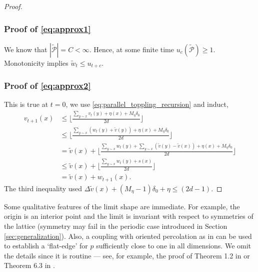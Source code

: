 \documentclass[12pt]{amsart}
\begin{document}
\begin{proof}
	
	\subsubsection*{Proof of \eqref{eq:approx1}}
	We know that $|\tilde{\mathcal{P}}| = C < \infty$. Hence, at some finite time 
	$u_{c}(\tilde{\mathcal{P}}) \geq 1$. Monotonicity implies $\tilde{w}_t \leq u_{t + c}$.
	
	\subsubsection*{Proof of \eqref{eq:approx2}}
	This is true at $t = 0$, we use \eqref{eq:parallel_toppling_recursion} and induct,
	\begin{align*}
	v_{t+1}(x) &\leq \lfloor \frac{\sum_{y \sim x} v_t(y) + \eta(x) + M_{\eta}  \delta_0}{2 d } \rfloor \\
	&\leq \lfloor \frac{\sum_{y \sim x} (w_t(y) + \tilde{v}(y)) + \eta(x) + M_{\eta}  \delta_0}{2 d } \rfloor \\
	&= \tilde{v}(x) + \lfloor \frac{\sum_{y \sim x} w_t(y) +  \sum_{y \sim x} (\tilde{v}(y) - \tilde{v}(x)) + \eta(x) + M_{\eta}  \delta_0}{2 d } \rfloor \\
	&\leq \tilde{v}(x) + \lfloor \frac{\sum_{y \sim x} w_t(y) +  s(x)}{2 d } \rfloor \\
	&= \tilde{v}(x) + w_{t+1}(x).
	\end{align*}
	The third inequality used $\Delta \tilde{v}(x) + (M_{\eta} - 1)  \delta_0 + \eta \leq (2 d -1)$.
	
	
	
	
	
	
	
\end{proof}


\begin{remark}
	Some qualitative features of the limit shape are immediate. For example, the origin is an interior point and the limit 
	is invariant with respect to symmetries of the lattice (symmetry may fail in the periodic case introduced in Section \ref{sec:generalization}).	
	Also, a coupling with oriented percolation as in \cite{durrett1981shape, marchand2002strict} can be used to establish a `flat-edge' 
	for $p$ sufficiently close to one in all dimensions. We omit the details since it is routine --- see, for example, the proof of Theorem 1.2 in \cite{alves2002shape} or Theorem 6.3 in \cite{garet2004asymptotic}.
\end{remark}
\end{document}
